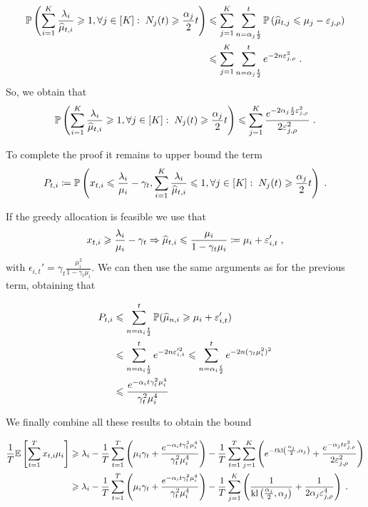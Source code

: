 \begin{align*}
\mathbb{P}\left(\sum_{i=1}^K \frac{\lambda_i}{\widehat{\mu}_{t, i}}\geqslant 1, \forall j \in [K]:\; N_j(t)\geqslant \frac{\alpha_j}{2}t\right) & \leqslant \sum_{j=1}^K \sum_{n=\alpha_j \frac{t}{2}}^t \mathbb{P}\left(\widehat{\mu}_{t,j} \leqslant \mu_j - \varepsilon_{j, \rho}\right) \\
& \leqslant \sum_{j=1}^K \sum_{n=\alpha_j \frac{t}{2}}^t e^{-2n \varepsilon_{j, \rho}^2} \;. \\
\end{align*}
So, we obtain that
\begin{equation}\label{eq::feasability_greedy}
\mathbb{P}\left(\sum_{i=1}^K \frac{\lambda_i}{\widehat{\mu}_{t, i}}\geqslant 1, \forall j \in [K]:\; N_j(t)\geqslant \frac{\alpha_j}{2}t\right) \leqslant \sum_{j=1}^K \frac{e^{-2\alpha_j \frac{t}{2} \varepsilon_{j, \rho}^2}}{2\varepsilon_{j, \rho}^2} \;.
\end{equation}

To complete the proof it remains to upper bound the term \[P_{t,i} \coloneqq \mathbb{P}\left(x_{t,i}\leqslant \frac{\lambda_i}{\mu_i}-\gamma_t, \sum_{i=1}^K \frac{\lambda_i}{\widehat{\mu}_{t, i}}\leqslant 1, \forall j \in [K]:\; N_j(t)\geqslant \frac{\alpha_j}{2}t\right) \;.\]

If the greedy allocation is feasible we use that
\[x_{t,i} \geqslant \frac{\lambda_i}{\mu_i} - \gamma_t \Rightarrow \widehat{\mu}_{t,i} \leqslant \frac{\mu_i}{1-\gamma_t \mu_i} \coloneqq \mu_i + \varepsilon_{i, t}' \;, \]
with $\epsilon_{i, t}'= \gamma_t \frac{\mu_i^2}{1-\gamma_t\mu_i}$. We can then use the same arguments as for the previous term, obtaining that 

\begin{align*}
P_{t,i} &\leqslant \sum_{n = \alpha_i \frac{t}{2}}^t \mathbb{P}(\widehat{\mu}_{n,i}\geqslant \mu_i + \varepsilon_{i, t}') \\
& \leqslant \sum_{n = \alpha_i \frac{t}{2}}^t e^{-2n \varepsilon_{i, t}'^2} \leqslant \sum_{n = \alpha_i \frac{t}{2}}^t e^{-2n (\gamma_t \mu_i^2)^2} \\
& \leqslant \frac{e^{-\alpha_i t \gamma_t^2 \mu_i^4}}{\gamma_t^2 \mu_i^4}
\end{align*}

We finally combine all these results to obtain the bound 

\begin{align*} 
\frac{1}{T} \mathbb{E}\left[\sum_{t=1}^T x_{t,i} \mu_i \right] &\geqslant \lambda_i - \frac{1}{T} \sum_{t=1}^T \left(\mu_i \gamma_t + \frac{e^{-\alpha_i t \gamma_t^2 \mu_i^4}}{\gamma_t^2 \mu_i^4}\right) - \frac{1}{T} \sum_{t=1}^T  \sum_{j=1}^K \left(e^{-t \text{\normalfont kl}\left(\frac{\alpha_j}{2}, \alpha_j\right)}+ \frac{e^{-\alpha_j t \varepsilon_{j, \rho}^2}}{2\varepsilon_{j, \rho}^2}\right) \\
& \geqslant \lambda_i - \frac{1}{T} \sum_{t=1}^T \left(\mu_i \gamma_t + \frac{e^{-\alpha_i t \gamma_t^2 \mu_i^4}}{\gamma_t^2 \mu_i^4}\right) - \frac{1}{T}\sum_{j=1}^K \left(\frac{1}{\text{\normalfont kl}\left(\frac{\alpha_j}{2}, \alpha_j\right)}+ \frac{1}{2 \alpha_j \varepsilon_{j, \rho}^4}\right) \;.
\end{align*}

